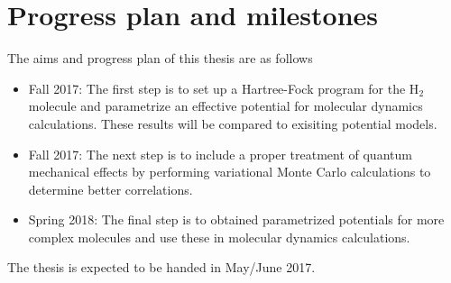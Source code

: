 \documentclass[10pt]{article}
\begin{document}
\section*{Progress plan and milestones}
The aims and progress plan of this thesis are as follows
\begin{itemize}
\item Fall 2017:  The first step is to set up a Hartree-Fock program for the H$_2$ molecule and parametrize an effective potential for molecular dynamics calculations. These results will be compared to exisiting potential models.
\item Fall 2017:  The next step is to include a proper treatment of quantum mechanical effects by performing variational Monte Carlo calculations to determine better correlations.
\item Spring 2018: The final step is to obtained parametrized potentials for more complex molecules and use these
in molecular dynamics calculations.
\end{itemize}
 
The thesis is expected to be handed in May/June 2017.
\end{document}
